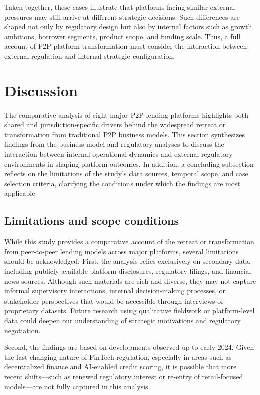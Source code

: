 \documentclass[pdflatex,sn-apa]{sn-jnl}%
\theoremstyle{thmstyleone}%
\theoremstyle{thmstyletwo}%
\theoremstyle{thmstylethree}%
\begin{document}
\textcolor{NavyBlue}{
Taken together, these cases illustrate that platforms facing similar external pressures may still arrive at different strategic decisions. Such differences are shaped not only by regulatory design but also by internal factors such as growth ambitions, borrower segments, product scope, and funding scale. Thus, a full account of P2P platform transformation must consider the interaction between external regulation and internal strategic configuration.
}

\section{Discussion}
\label{sec:discussion}

The comparative analysis of eight major P2P lending platforms highlights both shared and jurisdiction-specific drivers behind the widespread retreat or transformation from traditional P2P business models. This section synthesizes findings from the business model and regulatory analyses to discuss the interaction between internal operational dynamics and external regulatory environments in shaping platform outcomes. \textcolor{NavyBlue}{
In addition, a concluding subsection reflects on the limitations of the study’s data sources, temporal scope, and case selection criteria, clarifying the conditions under which the findings are most applicable.
}

\subsection{Limitations and scope conditions}

\textcolor{NavyBlue}{
While this study provides a comparative account of the retreat or transformation from peer-to-peer lending models across major platforms, several limitations should be acknowledged. First, the analysis relies exclusively on secondary data, including publicly available platform disclosures, regulatory filings, and financial news sources. Although such materials are rich and diverse, they may not capture informal supervisory interactions, internal decision-making processes, or stakeholder perspectives that would be accessible through interviews or proprietary datasets. Future research using qualitative fieldwork or platform-level data could deepen our understanding of strategic motivations and regulatory negotiation.}

\textcolor{NavyBlue}{
Second, the findings are based on developments observed up to early 2024. Given the fast-changing nature of FinTech regulation, especially in areas such as decentralized finance and AI-enabled credit scoring, it is possible that more recent shifts—such as renewed regulatory interest or re-entry of retail-focused models—are not fully captured in this analysis.}
\end{document}
